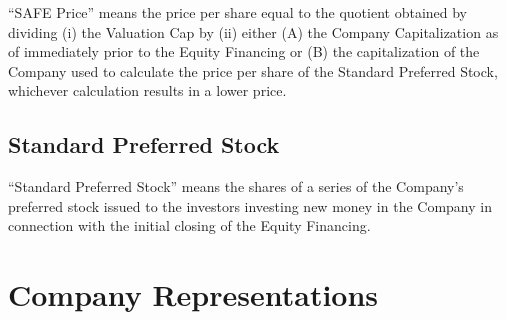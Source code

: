 \documentclass[12pt,letterpaper,fullpage]{article}
\begin{document}
“SAFE Price” means the price per share equal to the quotient obtained
by dividing (i) the Valuation Cap by (ii) either (A) the Company
Capitalization as of immediately prior to the Equity Financing or (B)
the capitalization of the Company used to calculate the price per
share of the Standard Preferred Stock, whichever calculation results
in a lower price.

\subsection{Standard Preferred Stock}
\label{sec:standardpreferredstock}

“Standard Preferred Stock” means the shares of a series of the
Company’s preferred stock issued to the investors investing new money
in the Company in connection with the initial closing of the Equity
Financing.

\section{Company Representations}
\label{sec:companyrepresentations}
\end{document}
